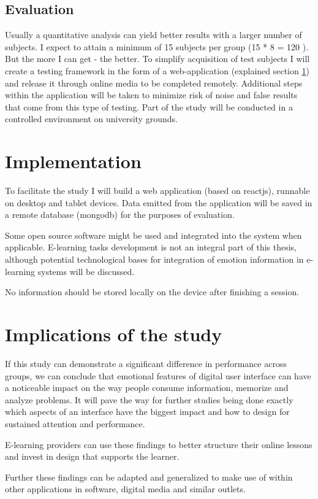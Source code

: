 \subsection{Evaluation}

Usually a quantitative analysis can yield better results with a larger number of subjects.
I expect to attain a minimum of 15 subjects per group (15 * 8 = 120 ). But the more I can get - the better.
To simplify acquisition of test subjects I will create a testing framework in the form of a web-application (explained section \ref{implementation}) and release it through online media to be completed remotely.
Additional steps within the application will be taken to minimize risk of noise and false results that come from this type of testing. Part of the study will be conducted in a controlled environment on university grounds.

\section{Implementation} \label{implementation}

To facilitate the study I will build a web application (based on reactjs), runnable on desktop and tablet devices. Data emitted from the application will be saved in a remote database (mongodb) for the purposes of evaluation.

Some open source software might be used and integrated into the system when applicable. E-learning tasks development is not an integral part of this thesis, although potential technological bases for integration of emotion information in e-learning systems will be discussed.

No information should be stored locally on the device after finishing a session.

\section{Implications of the study}

If this study can demonstrate a significant difference in performance across groups, we can conclude that emotional features of digital user interface can have a noticeable impact on the way people consume information, memorize and analyze problems.
It will pave the way for further studies being done exactly which aspects of an interface have the biggest impact and how to design for sustained attention and performance.

E-learning providers can use these findings to better structure their online lessons and invest in design that supports the learner.

Further these findings can be adapted and generalized to make use of within other applications in software, digital media and similar outlets.

